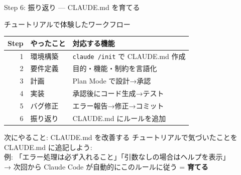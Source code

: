 \documentclass[aspectratio=169, 14pt]{beamer}
\begin{document}
\begin{frame}{Step 6: 振り返り — CLAUDE.md を育てる}
  \begin{block}{チュートリアルで体験したワークフロー}
    {\footnotesize
    \begin{tabular}{rll}
      \hline
      \textbf{Step} & \textbf{やったこと} & \textbf{対応する機能} \\
      \hline
      1 & 環境構築 & \texttt{claude /init} で CLAUDE.md 作成 \\
      2 & 要件定義 & 目的・機能・制約を言語化 \\
      3 & 計画 & Plan Mode で設計→承認 \\
      4 & 実装 & 承認後にコード生成→テスト \\
      5 & バグ修正 & エラー報告→修正→コミット \\
      6 & 振り返り & CLAUDE.md にルールを追加 \\
      \hline
    \end{tabular}
    }
  \end{block}

  \vspace{0.2em}

  \begin{exampleblock}{次にやること: CLAUDE.md を改善する}
    {\footnotesize
    チュートリアルで気づいたことを CLAUDE.md に追記しよう: \\
    例: 「エラー処理は必ず入れること」「引数なしの場合はヘルプを表示」\\
    → 次回から Claude Code が自動的にこのルールに従う = \textbf{育てる}}
  \end{exampleblock}
\end{frame}

\end{document}

